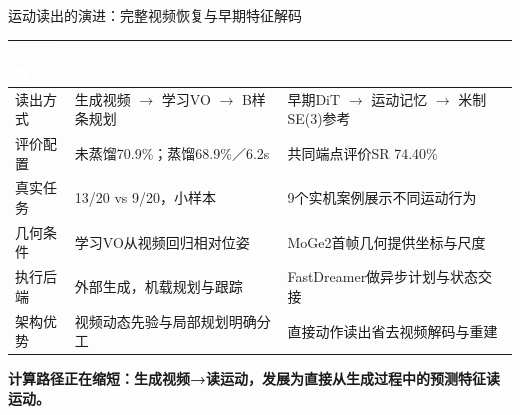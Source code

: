 \documentclass[aspectratio=169,10pt]{beamer}
\def\slidesource{}
\newcommand{\takeaway}[1]{\par\begin{takebox}\fontsize{9.1}{11.5}\selectfont\bfseries\color{navy}#1\end{takebox}}
\newcommand{\thd}[1]{\textcolor{white}{\bfseries #1}}
\begin{document}
\gdef\slidesource{原文依据：\href{https://arxiv.org/html/2606.01205v2}{[19] ImagineUAV}；\href{https://arxiv.org/html/2609.39763v1}{[20] DiffWAM}}
\begin{frame}[t,label=geometry_readout]{运动读出的演进：完整视频恢复与早期特征解码}
\relax
{\fontsize{8.7}{11.1}\selectfont
{}
\begin{tabularx}{\linewidth}{@{}Y{0.69}Y{1.29}Y{1.02}@{}}\toprule
{}\thd{比较维度} & \thd{ImagineUAV} & \thd{DiffWAM}\\\midrule
读出方式 & 生成视频 \ensuremath{\to} 学习VO \ensuremath{\to} B样条规划 & 早期DiT \ensuremath{\to} 运动记忆 \ensuremath{\to} 米制SE(3)参考\\
评价配置 & 未蒸馏70.9\%；蒸馏68.9\%／6.2s & 共同端点评价SR 74.40\%\\
真实任务 & 13/\allowbreak{}20 vs 9/\allowbreak{}20，小样本 & 9个实机案例展示不同运动行为\\
几何条件 & 学习VO从视频回归相对位姿 & MoGe2首帧几何提供坐标与尺度\\
执行后端 & 外部生成，机载规划与跟踪 & FastDreamer做异步计划与状态交接\\
架构优势 & 视频动态先验与局部规划明确分工 & 直接动作读出省去视频解码与重建\\
\bottomrule\end{tabularx}\par}
\takeaway{计算路径正在缩短：生成视频→读运动，发展为直接从生成过程中的预测特征读运动。}

\end{frame}
\end{document}
